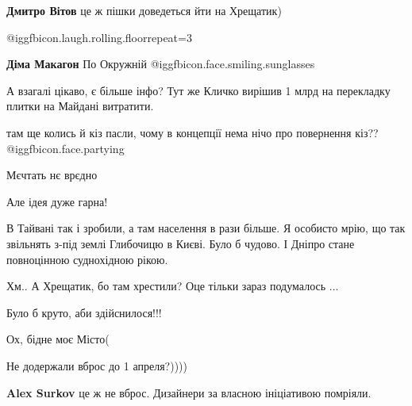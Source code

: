 \begin{itemize}
\begin{itemize}
\textbf{Дмитро Вітов} це ж пішки доведеться йти на Хрещатик)


 @igg{fbicon.laugh.rolling.floor}{repeat=3} 

\textbf{Діма Макагон} По Окружній @igg{fbicon.face.smiling.sunglasses} 
\end{itemize} %

А взагалі цікаво, є більше інфо? Тут же Кличко вирішив 1 млрд на перекладку плитки на Майдані витратити.

там ще колись й кіз пасли, чому в концепції нема нічо про повернення кіз?? @igg{fbicon.face.partying} 

Мєчтать нє врєдно

Але ідея дуже гарна!


В Тайвані так і зробили, а там населення в рази більше. Я особисто мрію, що так
звільнять з-під землі Глибочицю в Києві. Було б чудово. І Дніпро стане
повноцінною суднохідною рікою.

Хм.. А Хрещатик, бо там хрестили? Оце тільки зараз подумалось ...

Було б круто, аби здійснилося!!!

Ох, бідне моє Місто(

Не додержали вброс до 1 апреля?))))

\textbf{Alex Surkov} це ж не вброс. Дизайнери за власною ініціативою помріяли.

\end{itemize} %
